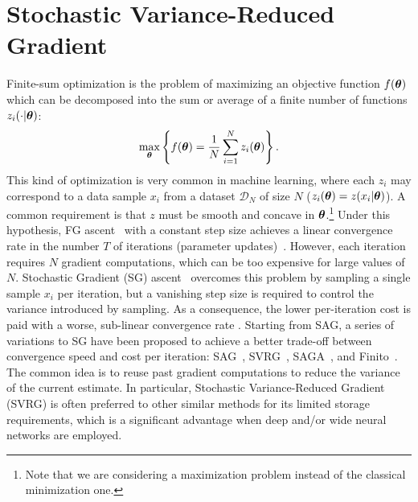 \section{Stochastic Variance-Reduced Gradient}\label{sec:svrg}
\vspace{-0.05in}
Finite-sum optimization is the problem of maximizing an objective function $f(\boldsymbol{\theta})$ which can be decomposed into the sum or average of a finite number of functions $z_i(\cdot|\boldsymbol{\theta})$:
\begin{align*}
        \max_{\boldsymbol{\theta}} \left\{ f(\boldsymbol{\theta}) = \frac{1}{N}\sum_{i=1}^{N}z_i(\boldsymbol{\theta})\right\}.
\end{align*}
This kind of optimization is very common in machine learning, where each $z_i$ may correspond to a data sample $x_i$ from a dataset $\mathcal{D}_N$ of size $N$ (\ie $z_i(\boldsymbol{\theta}) = z(x_i|\boldsymbol{\theta})$). 
A common requirement is that $z$ must be smooth and concave in $\boldsymbol{\theta}$.\footnote{Note that we are considering a maximization problem instead of the classical minimization one.} 
Under this hypothesis, \acs{FG} ascent~\citep{cauchy1847methode} with a constant step size achieves a linear convergence rate in the number $T$ of iterations (\ie parameter updates)~\citep{nesterov2013introductory}.
However, each iteration requires $N$ gradient computations, which can be too expensive for large values of $N$. Stochastic Gradient (\acs{SG}) ascent~\citep[\eg][]{robbins1951stochastic,bottou2004large} overcomes this problem by sampling a single sample $x_i$ per iteration, but a vanishing step size is required to control the variance introduced by sampling. As a consequence, the lower per-iteration cost is paid with a worse, sub-linear convergence rate \cite{nemirovskii1983problem}.
Starting from \acs{SAG}, a series of variations to \acs{SG} have been proposed to achieve a better trade-off between convergence speed and cost per iteration: \eg \acs{SAG}~\citep{roux2012stochastic}, \acs{SVRG}~\cite{johnson2013accelerating}, \acs{SAGA}~\cite{defazio2014saga}, and Finito~\cite{defazio2014finito}. 
The common idea is to reuse past gradient computations to reduce the variance of the current estimate.
In particular, Stochastic Variance-Reduced Gradient (\acs{SVRG}) is often preferred to other similar methods for its limited storage requirements, which is a significant advantage when deep and/or wide neural networks are employed.  

